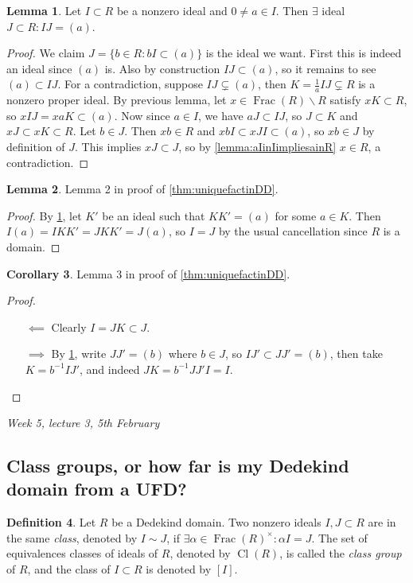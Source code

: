 \documentclass{article}
\newcommand{\Frac}{\operatorname{Frac}}
\newcommand{\Cl}{\operatorname{Cl}}
\theoremstyle{definition}
\newtheorem{defn}{Definition}[subsection]
\newtheorem{lemma}[defn]{Lemma}
\newtheorem{coro}[defn]{Corollary}
\begin{document}
\begin{lemma}
\label{lemma:principaliseIdeals}
Let $I\subset R$ be a nonzero ideal and $0\neq a\in I$. Then $\exists$ ideal $J\subset R:IJ=(a)$.
\end{lemma}
\begin{proof}
We claim $J=\{b\in R:bI\subset(a)\}$ is the ideal we want. First this is indeed an ideal since $(a)$ is. Also by construction $IJ\subset (a)$, so it remains to see $(a)\subset IJ$. For a contradiction, suppose $IJ\subsetneq (a)$, then $K=\frac{1}{a}IJ\subsetneq R$ is a nonzero proper ideal. By previous lemma, let $x\in\Frac(R)\backslash R$ satisfy $xK\subset R$, so $xIJ=xaK\subset (a)$. Now since $a\in I$, we have $aJ\subset IJ$, so $J\subset K$ and $xJ\subset xK\subset R$. Let $b\in J$. Then $xb\in R$ and $xbI\subset xJI\subset (a)$, so $xb\in J$ by definition of $J$. This implies $xJ\subset J$, so by \ref{lemma:aIinIimpliesainR} $x\in R$, a contradiction.
\end{proof}

\begin{lemma}
\label{lemma:uniquefactinDDlemma2}
Lemma 2 in proof of \ref{thm:uniquefactinDD}.
\end{lemma}
\begin{proof}
By \ref{lemma:principaliseIdeals}, let $K'$ be an ideal such that $KK'=(a)$ for some $a\in K$. Then $I(a)=IKK'=JKK'=J(a)$, so $I=J$ by the usual cancellation since $R$ is a domain.
\end{proof}

\begin{coro}
\label{coro:uniquefactinDDlemma3}
Lemma 3 in proof of \ref{thm:uniquefactinDD}.
\end{coro}
\begin{proof}
\begin{itemize}
\item[$\impliedby$] Clearly $I=JK\subset J$.
\item[$\implies$] By \ref{lemma:principaliseIdeals}, write $JJ'=(b)$ where $b\in J$, so $IJ'\subset JJ'=(b)$, then take $K=b^{-1}IJ'$, and indeed $JK=b^{-1}JJ'I=I$.
\end{itemize}
\end{proof}

\begin{flushright}
\textit{Week 5, lecture 3, 5th February}
\end{flushright}

\subsection{Class groups, or how far is my Dedekind domain from a UFD?}
\begin{defn}
Let $R$ be a Dedekind domain. Two nonzero ideals $I,J\subset R$ are in the same \textit{class}, denoted by $I\sim J$, if $\exists\alpha\in\Frac(R)^\times:\alpha I=J$. The set of equivalences classes of ideals of $R$, denoted by $\Cl(R)$, is called the \textit{class group} of $R$, and the class of $I\subset R$ is denoted by $[I]$.
\end{defn}
\end{document}
